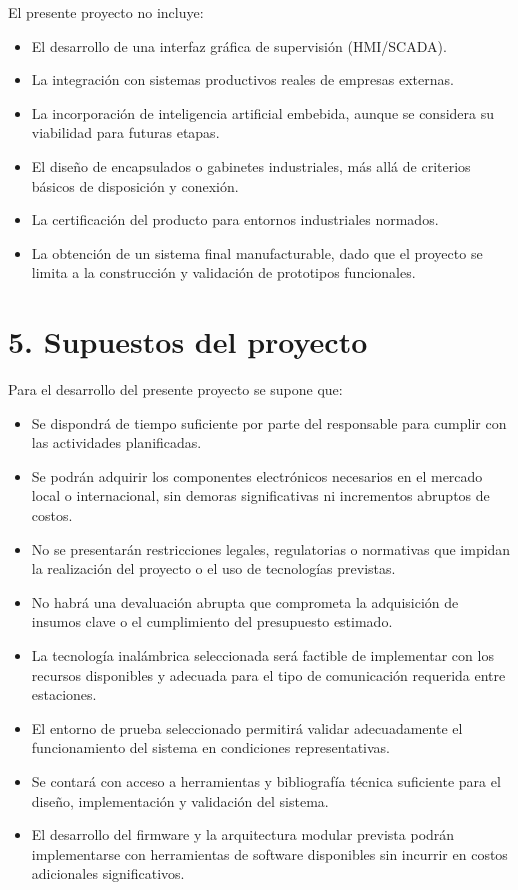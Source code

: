 \documentclass[
11pt, %
]{charter}
\begin{document}
El presente proyecto no incluye:
\begin{itemize}
	\item El desarrollo de una interfaz gráfica de supervisión (HMI/SCADA).
	\item La integración con sistemas productivos reales de empresas externas.
	\item La incorporación de inteligencia artificial embebida, aunque se considera su viabilidad para futuras etapas.
	\item El diseño de encapsulados o gabinetes industriales, más allá de criterios básicos de disposición y conexión.
	\item La certificación del producto para entornos industriales normados.
	\item La obtención de un sistema final manufacturable, dado que el proyecto se limita a la construcción y validación de prototipos funcionales.
\end{itemize}

\section{5. Supuestos del proyecto}
\label{sec:supuestos}

Para el desarrollo del presente proyecto se supone que:

\begin{itemize}
	\item Se dispondrá de tiempo suficiente por parte del responsable para cumplir con las actividades planificadas.
	\item Se podrán adquirir los componentes electrónicos necesarios en el mercado local o internacional, sin demoras significativas ni incrementos abruptos de costos.
	\item No se presentarán restricciones legales, regulatorias o normativas que impidan la realización del proyecto o el uso de tecnologías previstas.
	\item No habrá una devaluación abrupta que comprometa la adquisición de insumos clave o el cumplimiento del presupuesto estimado.
	\item La tecnología inalámbrica seleccionada será factible de implementar con los recursos disponibles y adecuada para el tipo de comunicación requerida entre estaciones.
	\item El entorno de prueba seleccionado permitirá validar adecuadamente el funcionamiento del sistema en condiciones representativas.
	\item Se contará con acceso a herramientas y bibliografía técnica suficiente para el diseño, implementación y validación del sistema.
	\item El desarrollo del firmware y la arquitectura modular prevista podrán implementarse con herramientas de software disponibles sin incurrir en costos adicionales significativos.
\end{itemize}
\end{document}
